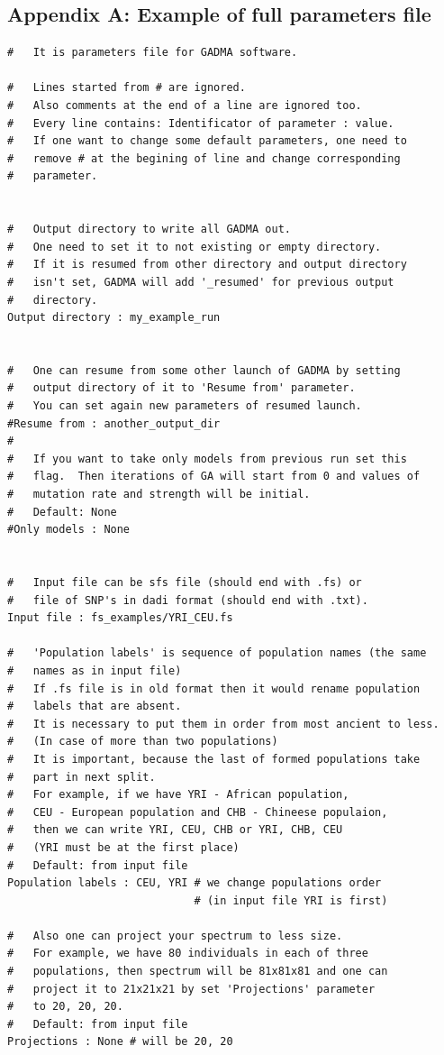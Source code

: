 \documentclass[12pt]{article}
\begin{document}
\newpage
\begin{appendices}
\section{Appendix A: Example of full parameters file}
\label{sec:example-params}
\begin{lstlisting}
#	It is parameters file for GADMA software.

#   Lines started from # are ignored.
#   Also comments at the end of a line are ignored too.
#   Every line contains: Identificator of parameter : value.
#   If one want to change some default parameters, one need to
#   remove # at the begining of line and change corresponding
#   parameter.


#   Output directory to write all GADMA out.
#   One need to set it to not existing or empty directory.
#   If it is resumed from other directory and output directory 
#   isn't set, GADMA will add '_resumed' for previous output 
#   directory.
Output directory : my_example_run


#   One can resume from some other launch of GADMA by setting
#   output directory of it to 'Resume from' parameter.
#   You can set again new parameters of resumed launch.
#Resume from : another_output_dir
#
#	If you want to take only models from previous run set this 
#	flag.  Then iterations of GA will start from 0 and values of
#	mutation rate and strength will be initial.
#	Default: None
#Only models : None


#   Input file can be sfs file (should end with .fs) or 
#   file of SNP's in dadi format (should end with .txt).
Input file : fs_examples/YRI_CEU.fs

#   'Population labels' is sequence of population names (the same
#   names as in input file)
#   If .fs file is in old format then it would rename population 
#   labels that are absent.
#   It is necessary to put them in order from most ancient to less. 
#   (In case of more than two populations)
#   It is important, because the last of formed populations take
#   part in next split.
#   For example, if we have YRI - African population,
#   CEU - European population and CHB - Chineese populaion,
#   then we can write YRI, CEU, CHB or YRI, CHB, CEU 
#   (YRI must be at the first place)
#   Default: from input file
Population labels : CEU, YRI # we change populations order 
                             # (in input file YRI is first)

#   Also one can project your spectrum to less size.
#   For example, we have 80 individuals in each of three 
#   populations, then spectrum will be 81x81x81 and one can 
#   project it to 21x21x21 by set 'Projections' parameter 
#   to 20, 20, 20.
#   Default: from input file
Projections : None # will be 20, 20





\end{lstlisting}
\end{appendices}
\end{document}
